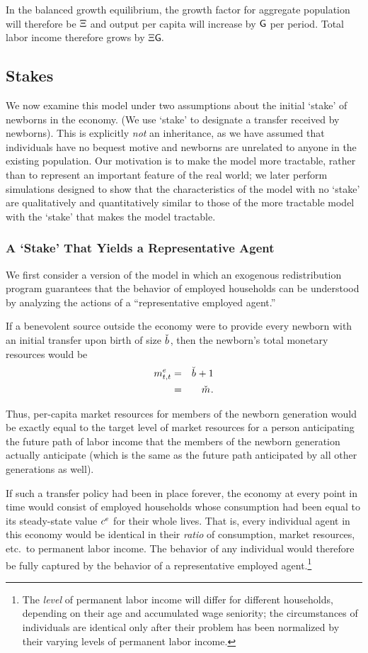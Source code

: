 \documentclass{handout}
\begin{document}
In the balanced growth equilibrium, the growth factor for aggregate population
will therefore be $\Xi$ and output per capita will increase by $\mathsf{G}$ per period.  Total
labor income therefore grows by $\Xi \mathsf{G}.$


\subsection{Stakes}

We now examine this model under two assumptions about the initial
`stake' of newborns in the economy.  (We use `stake' to designate a
transfer received by newborns).  This is explicitly {\it not} an
inheritance, as we have assumed that individuals have no bequest
motive and newborns are unrelated to anyone in the existing
population.  Our motivation is to make the model more tractable,
rather than to represent an important feature of the real world; we
later perform simulations designed to show that the characteristics of
the model with no `stake' are qualitatively and quantitatively similar
to those of the more tractable model with the `stake' that makes the
model tractable.

\subsubsection{A `Stake' That Yields a Representative Agent}

We first consider a version of the model in which an exogenous
redistribution program guarantees that the behavior of employed households can 
be understood by analyzing the actions of a ``representative employed agent.''  

If a benevolent source outside the economy were to provide every newborn with an initial
transfer upon birth of size $\bTarg^{\null}$, then the newborn's total monetary resources 
would be
\begin{eqnarray*}
  \mRatE_{t,t} & = & \bTarg^{\null} + 1
\\ & = & \mTarg^{\null} 
.
\end{eqnarray*}

Thus, per-capita market resources for members of the newborn generation
would be exactly equal to the target level of market resources for a
person anticipating the future path of labor income that the members of the newborn
generation actually anticipate (which is the same as the future path
anticipated by all other generations as well).

If such a transfer policy had been in place forever, the economy at every 
point in time would consist of employed households whose consumption had 
been equal to its steady-state value $c^{e}$ for their whole lives.  That is, every 
individual agent in this economy would be identical in their {\it ratio} of consumption,
market resources, etc.\ to permanent labor income.  
The behavior of any individual would therefore be fully captured by the behavior
of a representative employed agent.\footnote{The {\it level} of permanent 
labor income will differ for different households, depending on their age
and accumulated wage seniority; the circumstances of individuals are identical
only after their problem has been normalized by their varying levels of permanent 
labor income.}
\end{document}
